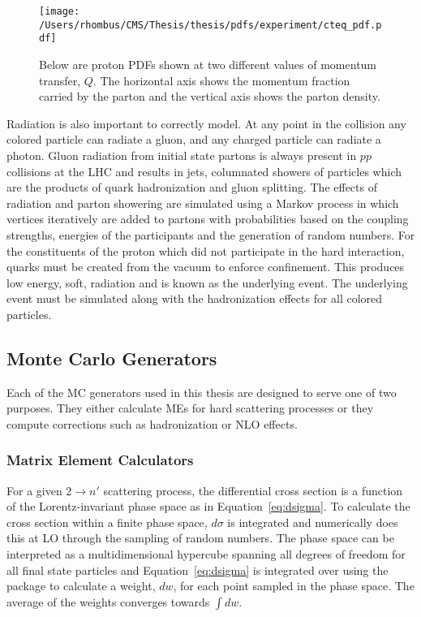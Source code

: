 \begin{figure}[htb]
 \center
 \caption[Example Parton Distribution Function from CTEQ6M]{
  Below are proton PDFs shown at two different values of
   momentum transfer, $Q$. 
  The horizontal axis shows the
   momentum fraction carried by the parton
   and the vertical axis shows the parton density.
 } 
 \texttt{[image: /Users/rhombus/CMS/Thesis/thesis/pdfs/experiment/cteq\_pdf.pdf]}
    \label{fig:cteqpdfs}
\end{figure}

 Radiation is also important to correctly model.
 At any point in the collision
  any colored particle can radiate a gluon,
  and any charged particle can radiate a photon.
 Gluon radiation from initial state partons is always present
  in $pp$ collisions at the LHC
  and results in jets, columnated showers
  of particles which are the products of quark hadronization
  and gluon splitting.
 The effects of radiation and parton showering are simulated
  using a Markov process in which 
  vertices iteratively are added to partons
  with probabilities based on the
  coupling strengths, energies of the participants
  and the generation of random numbers.
 For the constituents of the proton which
  did not participate in the hard interaction,
  quarks must be created from the vacuum
  to enforce confinement.
 This produces low energy, soft, radiation
  and is known as the underlying event.
 The underlying event must be simulated
  along with the hadronization effects for
  all colored particles.

\subsection{Monte Carlo Generators}

Each of the MC generators used in this
 thesis are designed to serve one of two
 purposes. 
They either calculate MEs for hard
 scattering processes or they compute
 corrections such as hadronization
 or NLO effects.

  
\subsubsection{Matrix Element Calculators}
 For a given $2\rightarrow n'$
  scattering process, the differential cross section is
  a function of the Lorentz-invariant phase space
  as in Equation~\ref{eq:dsigma}.
 To calculate the cross section within 
  a finite phase space, $d\sigma$
  is integrated and 
  \MADGRAPH numerically does this at LO
  through the sampling of random numbers.
 The phase space can be interpreted as a multidimensional 
  hypercube spanning all degrees of freedom
  for all final state particles
  and Equation~\ref{eq:dsigma} is 
  integrated over using the \VEGAS package
  to calculate a weight, $dw$, for each point
  sampled in the phase space.
 The average
  of the weights converges towards $\int dw$.

